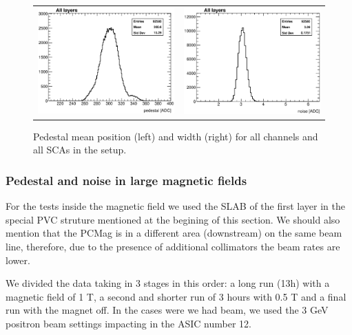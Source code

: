 \documentclass[a4paper,11pt]{article}
\begin{document}
\begin{figure}[!t]
  \centering
  \begin{tabular}{ll}
    \includegraphics[width=2.8in]{figs/pedestal/h_ped_mean.eps} & \includegraphics[width=2.8in]{figs/pedestal/h_ped_width.eps}
  \end{tabular}
  \caption{Pedestal mean position (left) and width (right) for all channels and all SCAs in the setup.}
\label{pedestal_all}
\end{figure}

\subsubsection{Pedestal and noise in large magnetic fields}
\label{sec:magnetic}

For the tests inside the magnetic field we used the SLAB of the first layer
in the special PVC struture mentioned at the begining of this section. We should also mention that
the PCMag is in a different area (downstream) on the same beam line,
therefore, due to the presence of additional collimators the beam rates are lower.

We divided the
data taking in 3 stages in this order:
a long run (13h) with a magnetic field of 1 T, a second and shorter run of 3 hours with 0.5 T and a final run with the magnet off.
In the cases were we had beam, we used the 3 GeV positron beam settings impacting in the ASIC number 12.
\end{document}
